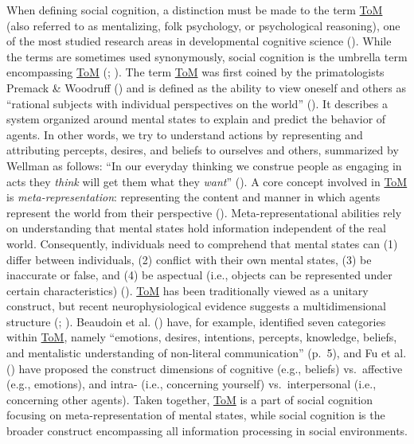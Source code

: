 \documentclass[
]{scrbook}
\begin{document}
When defining social cognition, a distinction must be made to the term \hyperref[acronyms_ToM]{ToM} (also referred to as mentalizing, folk psychology, or psychological reasoning), one of the most studied research areas in developmental cognitive science (). While the terms are sometimes used synonymously, social cognition is the umbrella term encompassing \hyperref[acronyms_ToM]{ToM} (; ). The term \hyperref[acronyms_ToM]{ToM} was first coined by the primatologists Premack \& Woodruff () and is defined as the ability to view oneself and others as ``rational subjects with individual perspectives on the world'' (). It describes a system organized around mental states to explain and predict the behavior of agents. In other words, we try to understand actions by representing and attributing percepts, desires, and beliefs to ourselves and others, summarized by Wellman as follows: ``In our everyday thinking we construe people as engaging in acts they \emph{think} will get them what they \emph{want}'' (). A core concept involved in \hyperref[acronyms_ToM]{ToM} is \emph{meta-representation}: representing the content and manner in which agents represent the world from their perspective (). Meta-representational abilities rely on understanding that mental states hold information independent of the real world. Consequently, individuals need to comprehend that mental states can (1) differ between individuals, (2) conflict with their own mental states, (3) be inaccurate or false, and (4) be aspectual (i.e., objects can be represented under certain characteristics) (). \hyperref[acronyms_ToM]{ToM} has been traditionally viewed as a unitary construct, but recent neurophysiological evidence suggests a multidimensional structure (; ). Beaudoin et al. () have, for example, identified seven categories within \hyperref[acronyms_ToM]{ToM}, namely ``emotions, desires, intentions, percepts, knowledge, beliefs, and mentalistic understanding of non-literal communication'' (p.~5), and Fu et al. () have proposed the construct dimensions of cognitive (e.g., beliefs) vs.~affective (e.g., emotions), and intra- (i.e., concerning yourself) vs.~interpersonal (i.e., concerning other agents). Taken together, \hyperref[acronyms_ToM]{ToM} is a part of social cognition focusing on meta-representation of mental states, while social cognition is the broader construct encompassing all information processing in social environments.
\end{document}
